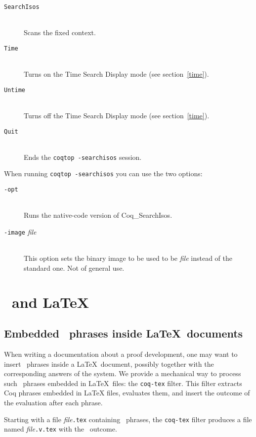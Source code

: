 \begin{description}
\item [{\tt SearchIsos}]\ \\
  Scans the fixed context.
\item [{\tt Time}]\ \\
  Turns on the Time Search Display mode (see section~\ref{time}).
\item [{\tt Untime}]\ \\
  Turns off the Time Search Display mode (see section~\ref{time}).
\item [{\tt Quit}]\ \\
  Ends the {\tt coqtop -searchisos} session.
\end{description}

When running {\tt coqtop -searchisos} you can use the two options:

\begin{description}
\item[{\tt -opt}]\ \\
  Runs the native-code version of {\sf Coq\_SearchIsos}.

\item[{\tt -image} {\em file}]\ \\
  This option sets the binary image to be used to be {\em file}
  instead of the standard one. Not of general use.
\end{description}


\section{\Coq\ and \LaTeX}\label{Latex}

\subsection{Embedded \Coq\ phrases inside \LaTeX\ documents}

When writing a documentation about a proof development, one may want
to insert \Coq\ phrases inside a \LaTeX\ document, possibly together with
the corresponding answers of the system. We provide a
mechanical way to process such \Coq\ phrases embedded in \LaTeX\ files: the
{\tt coq-tex} filter.  This filter extracts Coq phrases embedded in
LaTeX files, evaluates them, and insert the outcome of the evaluation
after each phrase.

Starting with a file {\em file}{\tt.tex} containing \Coq\ phrases,
the {\tt coq-tex} filter produces a file named {\em file}{\tt.v.tex} with
the \Coq\ outcome. 

